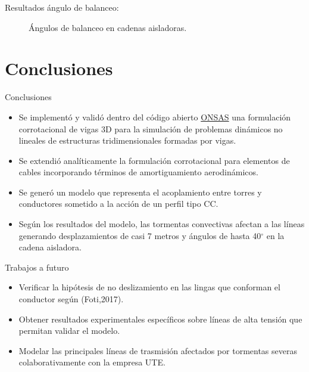 \documentclass[
  aspectratio=169,
]{beamer}
\begin{document}
\begin{small}
\begin{frame}{Resultados ángulo de balanceo:}
\begin{figure}[htbp]
		\caption{Ángulos de balanceo en cadenas aisladoras.}
	\end{figure}
\end{frame}
\section[Conclusiones]{Conclusiones}

\begin{frame}{Conclusiones }
	\begin{itemize}
		\item  Se implementó y validó dentro del código abierto \href{https://github.com/ONSAS/ONSAS.m/}{ONSAS} una formulación corrotacional de vigas 3D para la simulación de problemas dinámicos no lineales de estructuras tridimensionales formadas por vigas.
		\pause 
		\item Se extendió analíticamente la formulación corrotacional para elementos de cables incorporando términos de amortiguamiento aerodinámicos.
		\pause
		\item Se generó un modelo que representa el acoplamiento entre torres y conductores sometido a la acción de un perfil tipo CC.
		\pause
		\item Según los resultados del modelo, las tormentas convectivas afectan a las líneas generando desplazamientos de casi 7 metros y ángulos de hasta 40$^{\circ}$ en la cadena aisladora. 
	\end{itemize}
\end{frame}
\begin{frame}{Trabajos a futuro }
	\begin{itemize}
		\item Verificar la hipótesis de no deslizamiento en las lingas que conforman el conductor según {\color{blue}(Foti,2017)}.
		\pause
		\item Obtener resultados experimentales específicos sobre líneas de alta tensión que permitan validar el modelo. 
		\pause
		\item Modelar las principales líneas de trasmisión afectados por tormentas severas colaborativamente con la empresa UTE.

\end{itemize}
\end{frame}
\end{small}
\end{document}
